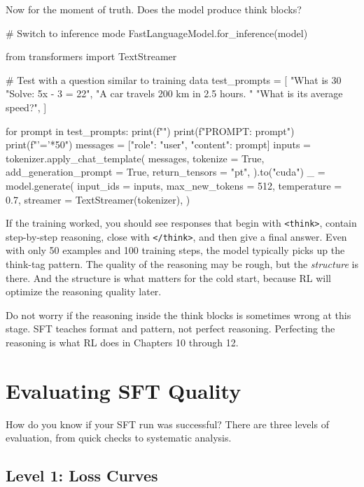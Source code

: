 \begin{chapterenv}
Now for the moment of truth. Does the model produce think blocks?

\begin{codeblock}[python]
# Switch to inference mode
FastLanguageModel.for_inference(model)

from transformers import TextStreamer

# Test with a question similar to training data
test_prompts = [
    "What is 30%
    "Solve: 5x - 3 = 22",
    "A car travels 200 km in 2.5 hours. "
    "What is its average speed?",
]

for prompt in test_prompts:
    print(f"")
    print(f"PROMPT: {prompt}")
    print(f"{'='*50}")
    messages = [{"role": "user", "content": prompt}]
    inputs = tokenizer.apply_chat_template(
        messages,
        tokenize = True,
        add_generation_prompt = True,
        return_tensors = "pt",
    ).to("cuda")
    _ = model.generate(
        input_ids = inputs,
        max_new_tokens = 512,
        temperature = 0.7,
        streamer = TextStreamer(tokenizer),
    )
\end{codeblock}

If the training worked, you should see responses that begin with \texttt{<think>}, contain step-by-step reasoning, close with \texttt{</think>}, and then give a final answer. Even with only 50 examples and 100 training steps, the model typically picks up the think-tag pattern. The quality of the reasoning may be rough, but the \textit{structure} is there. And the structure is what matters for the cold start, because RL will optimize the reasoning quality later.

\begin{tipbox}
Do not worry if the reasoning inside the think blocks is sometimes wrong at this stage. SFT teaches format and pattern, not perfect reasoning. Perfecting the reasoning is what RL does in Chapters 10 through 12.
\end{tipbox}

\section{Evaluating SFT Quality}

How do you know if your SFT run was successful? There are three levels of evaluation, from quick checks to systematic analysis.

\subsection{Level 1: Loss Curves}


\end{chapterenv}
